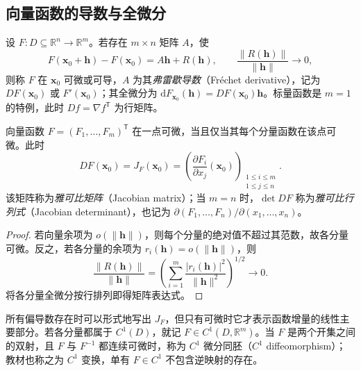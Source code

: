 \documentclass[UTF8,12pt,a4paper,fontset=fandol]{ctexbook}
\begin{document}
\subsection{向量函数的导数与全微分}
\label{subsec:derivatives-and-total-differentials-of-vector-functions}

\begin{definition}
\label{def:frechet-derivative-and-jacobian-ch14}
设 $F:D\subseteq\mathbb R^n\to\mathbb R^m$。若存在 $m\times n$ 矩阵 $A$，使
\[
    F(\boldsymbol x_0+\boldsymbol h)-F(\boldsymbol x_0)
    =A\boldsymbol h+R(\boldsymbol h),\qquad
    \frac{\|R(\boldsymbol h)\|}{\|\boldsymbol h\|}\longrightarrow0,
\]
则称 $F$ 在 $\boldsymbol x_0$ 可微或可导，$A$ 为其\emph{弗雷歇导数}（Fr\'echet derivative），记为 $DF(\boldsymbol x_0)$ 或 $F'(\boldsymbol x_0)$；其全微分为 $\mathrm dF_{\boldsymbol x_0}(\boldsymbol h)=DF(\boldsymbol x_0)\boldsymbol h$。标量函数是 $m=1$ 的特例，此时 $Df=\nabla f^{\mathsf T}$ 为行矩阵。
\end{definition}

\begin{theorem}
\label{thm:componentwise-vector-differentiability-ch14}
向量函数 $F=(F_1,\ldots,F_m)^{\mathsf T}$ 在一点可微，当且仅当其每个分量函数在该点可微。此时
\begin{equation}
\label{eq:jacobian-matrix-ch14}
    DF(\boldsymbol x_0)=J_F(\boldsymbol x_0)
    =\left(\frac{\partial F_i}{\partial x_j}(\boldsymbol x_0)\right)_{
        \substack{1\leq i\leq m\\1\leq j\leq n}}.
\end{equation}
该矩阵称为\emph{雅可比矩阵}（Jacobian matrix）；当 $m=n$ 时，$\det DF$ 称为\emph{雅可比行列式}（Jacobian determinant），也记为 $\partial(F_1,\ldots,F_n)/\partial(x_1,\ldots,x_n)$。
\end{theorem}
\begin{proof}
若向量余项为 $o(\|\boldsymbol h\|)$，则每个分量的绝对值不超过其范数，故各分量可微。反之，若各分量的余项为 $r_i(\boldsymbol h)=o(\|\boldsymbol h\|)$，则
\[
    \frac{\|R(\boldsymbol h)\|}{\|\boldsymbol h\|}
    =\left(\sum_{i=1}^m\frac{|r_i(\boldsymbol h)|^2}{\|\boldsymbol h\|^2}\right)^{1/2}
    \longrightarrow0.
\]
将各分量全微分按行排列即得矩阵表达式。
\end{proof}

所有偏导数存在时可以形式地写出 $J_F$，但只有可微时它才表示函数增量的线性主要部分。若各分量都属于 $C^1(D)$，就记 $F\in C^1(D,\mathbb R^m)$。当 $F$ 是两个开集之间的双射，且 $F$ 与 $F^{-1}$ 都连续可微时，称为 $C^1$ 微分同胚（$C^1$ diffeomorphism）；教材也称之为 $C^1$ 变换，单有 $F\in C^1$ 不包含逆映射的存在。
\end{document}
